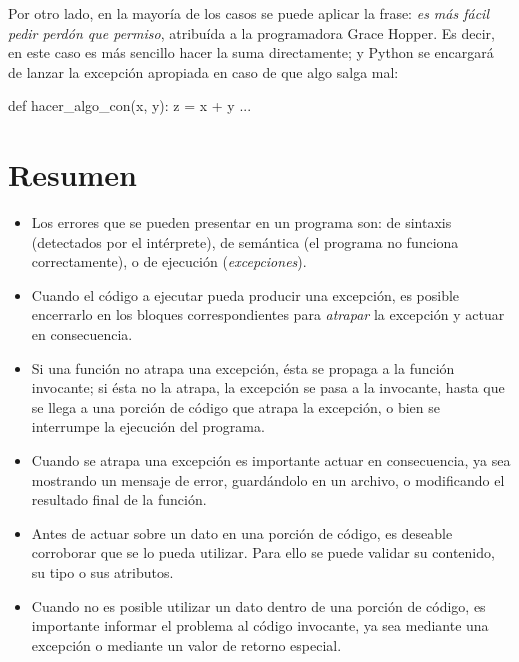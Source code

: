 Por otro lado, en la mayoría de los casos se puede aplicar la frase:
\emph{es más fácil pedir perdón que permiso}, atribuída a la programadora Grace
Hopper. Es decir, en este caso es más sencillo hacer la suma directamente; y
Python se encargará de lanzar la excepción apropiada en caso de que algo salga
mal:

\begin{codigo-python-sn}
def hacer_algo_con(x, y):
    z = x + y
    ...
\end{codigo-python-sn}

\section{Resumen}

\begin{itemize}
\item Los errores que se pueden presentar en un programa son: de sintaxis
(detectados por el intérprete), de semántica (el programa no funciona
correctamente), o de ejecución (\emph{excepciones}).
\item Cuando el código a ejecutar pueda producir una excepción, es posible
encerrarlo en los bloques correspondientes para \emph{atrapar} la excepción y
actuar en consecuencia.
\item Si una función no atrapa una excepción, ésta se propaga a la
función invocante; si ésta no la atrapa, la excepción se pasa a la
invocante, hasta que se llega a una porción de código que atrapa la
excepción, o bien se interrumpe la ejecución del programa.
\item Cuando se atrapa una excepción es importante actuar en consecuencia,
ya sea mostrando un mensaje de error, guardándolo en un archivo, o
modificando el resultado final de la función.
\item Antes de actuar sobre un dato en una porción de código, es deseable
corroborar que se lo pueda utilizar. Para ello se puede validar su contenido,
su tipo o sus atributos.
\item Cuando no es posible utilizar un dato dentro de una porción de
código, es importante informar el problema al código invocante, ya sea
mediante una excepción o mediante un valor de retorno especial.
\end{itemize}

